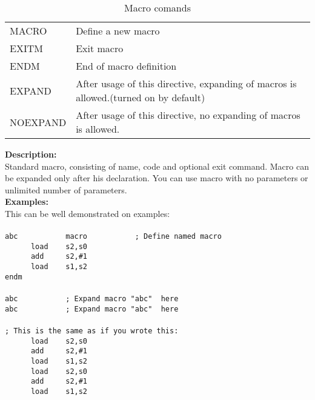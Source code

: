         \begin{table}[h!]
            \begin{tabular}{|ll|}
                    \hline
                    MACRO      & Define a new macro \\
                    EXITM      & Exit macro  \\
                    ENDM       & End of macro definition \\
                    EXPAND     & After usage of this directive, expanding of macros is allowed.(turned on by default)\\
                    NOEXPAND   & After usage of this directive, no expanding of macros is allowed.\\
                    \hline
            \end{tabular}
            \caption{Macro comands}
        \end{table}
        \textbf{Description:}\\
        Standard macro, consisting of name, code and optional exit command. Macro can be expanded only after his declaration. You can use macro
        with no parameters  or unlimited number of parameters.\\
        \textbf{Examples:}\\
        This can be well demonstrated on examples:
        {
            ~\\
            \usecodefont\\
            \verb'abc           macro           ; Define named macro '\\
            \verb'      load    s2,s0'\\
            \verb'      add     s2,#1'\\
            \verb'      load    s1,s2'\\
            \verb'endm'\\\\
            \verb'abc           ; Expand macro "abc"  here'\\
            \verb'abc           ; Expand macro "abc"  here'\\\\
            \verb'; This is the same as if you wrote this:'\\
            \verb'      load    s2,s0'\\
            \verb'      add     s2,#1'\\
            \verb'      load    s1,s2'\\
            \verb'      load    s2,s0'\\
            \verb'      add     s2,#1'\\
            \verb'      load    s1,s2'\\
        }


